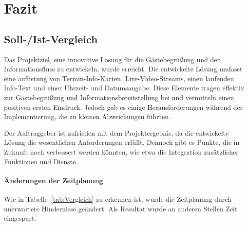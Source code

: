 \section{Fazit} 
\label{sec:Fazit}

\subsection{Soll-/Ist-Vergleich}
\label{sec:SollIstVergleich}

Das Projektziel, eine innovative Lösung für die Gästebegrüßung und den Informationsfluss zu entwickeln, wurde erreicht.
Die entwickelte Lösung umfasst eine auflistung von Termin-Info-Karten, Live-Video-Streams, einen laufenden Info-Text und einer Uhrzeit- und Datumsangabe.
Diese Elemente tragen effektiv zur Gästebegrüßung und Informationsbereitstellung bei und vermitteln einen positiven ersten Eindruck.
Jedoch gab es einige Herausforderungen während der Implementierung, die zu kleinen Abweichungen führten.


Der Auftraggeber ist zufrieden mit dem Projektergebnis, da die entwickelte Lösung die wesentlichen Anforderungen erfüllt.
Dennoch gibt es Punkte, die in Zukunft noch verbessert werden könnten, wie etwa die Integration zusätzlicher Funktionen und Dienste.

\paragraph{Änderungen der Zeitplanung}
Wie in Tabelle~\ref{tab:Vergleich} zu erkennen ist, wurde die Zeitplanung durch unerwartete Hindernisse geändert.
Als Resultat wurde an anderen Stellen Zeit eingespart.


